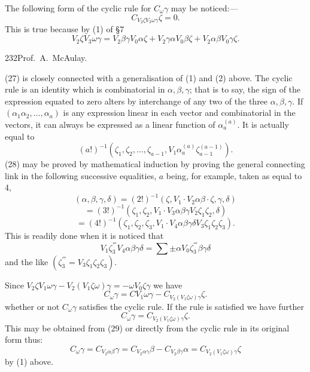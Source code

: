 \documentclass[11pt]{article}
\begin{document}
\indent The following form of the cyclic rule for $C_\omega\gamma$ may be noticed:---
\begin{equation}C_{V_2\zeta V_3\omega\gamma}\zeta=0.\tag{27}\end{equation}
This is true because by (1) of \S7
\[
V_2\zeta V_3\omega\gamma=V_2\beta\gamma V_0\alpha\zeta+V_2\gamma\alpha V_0\beta\zeta+V_2\alpha\beta V_0\gamma\zeta.
\]
\newpage\thispagestyle{empty}\begin{center}232\hfill Prof.\ A.\ McAulay.\end{center}
(27) is closely connected with a generalisation of (1) and (2) above. The cyclic rule is an identity which is combinatorial in $\alpha,\beta,\gamma$; that is to say, the sign of the expression equated to zero alters by interchange of any two of the three $\alpha,\beta,\gamma$. If $(\alpha_1\alpha_2,\ldots,\alpha_a)$ is any expression linear in each vector and combinatorial in the vectors, it can always be expressed as a linear function of $\alpha_a^{(a)}$. It is actually equal to
\begin{equation}(a!)^{-1}(\zeta_1,\zeta_2,\ldots,\zeta_{a-1},V_1\alpha_a^{(a)}\zeta_{a-1}^{(a-1)}).\tag{28}\end{equation}
(28) may be proved by mathematical induction by proving the general connecting link in the following successive equalities, $a$ being, for example, taken as equal to 4,
\[
(\alpha,\beta,\gamma,\delta)=(2!)^{-1}(\zeta,V_1\mathbin{\cdot}V_2\alpha\beta\mathbin{\cdot}\zeta,\gamma,\delta)
\]
\[
=(3!)^{-1}(\zeta_1,\zeta_2,V_1\mathbin{\cdot}V_3\alpha\beta\gamma V_2\zeta_1\zeta_2,\delta)
\]
\[
=(4!)^{-1}(\zeta_1,\zeta_2,\zeta_3,V_1\mathbin{\cdot}V_4\alpha\beta\gamma\delta V_3\zeta_1\zeta_2\zeta_3).
\]
This is readily done when it is noticed that
\[
V_1\zeta_3^{'''}V_4\alpha\beta\gamma\delta=\sum\pm\alpha V_0\zeta_3^{'''}\beta\gamma\delta
\]
and the like $(\zeta_3^{'''}=V_3\zeta_1\zeta_2\zeta_3)$.

\indent Since $V_2\zeta V_1\omega\gamma-V_2(V_1\zeta\omega)\gamma=-\omega V_0\zeta\gamma$ we have
\begin{equation}C_\omega\gamma=CV_1\omega\gamma-C_{V_2(V_1\zeta\omega)\gamma}\zeta.\tag{29}\end{equation}
whether or not $C_\omega\gamma$ satisfies the cyclic rule. If the rule is satisfied we have further
\begin{equation}C_\omega\gamma=C_{V_2(V_1\zeta\omega)\gamma}\zeta.\tag{30}\end{equation}
This may be obtained from (29) or directly from the cyclic rule in its original form thus:
\[
C_\omega\gamma=C_{V_2\alpha\beta}\gamma=C_{V_2\alpha\gamma}\beta-C_{V_2\beta\gamma}\alpha=C_{V_2(V_1\zeta\omega)\gamma}\zeta
\]
by (1) above.
\end{document}
